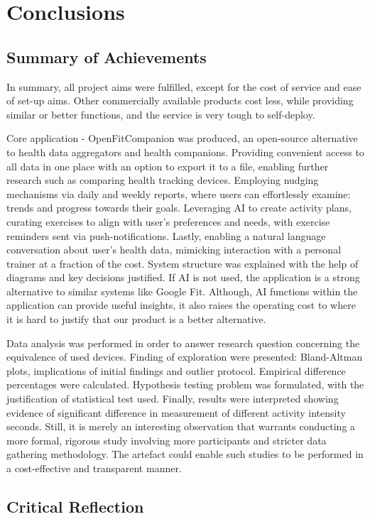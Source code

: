 \chapter{Conclusions}
\label{cha:evaluation}
\section{Summary of Achievements}
In summary, all project aims were fulfilled, except for the cost of service and ease of set-up aims. Other commercially available products cost less, while providing similar or better functions, and the service is very tough to self-deploy.

Core application - OpenFitCompanion was produced, an open-source alternative to health data aggregators and health companions. Providing convenient access to all data in one place with an option to export it to a file, enabling further research such as comparing health tracking devices. Employing nudging mechanisms via daily and weekly reports, where users can effortlessly examine: trends and progress towards their goals. Leveraging AI to create activity plans, curating exercises to align with user's preferences and needs, with exercise reminders sent via push-notifications. Lastly, enabling a natural language conversation about user's health data, mimicking interaction with a personal trainer at a fraction of the cost. System structure was explained with the help of diagrams and key decisions justified. If AI is not used, the application is a strong alternative to similar systems like Google Fit. Although, AI functions within the application can provide useful insights, it also raises the operating cost to where it is hard to justify that our product is a better alternative. 

Data analysis was performed in order to answer research question concerning the equivalence of used devices. Finding of exploration were presented: Bland-Altman plots, implications of initial findings and outlier protocol. Empirical difference percentages were calculated. Hypothesis testing problem was formulated, with the justification of statistical test used. Finally, results were interpreted showing evidence of significant difference in measurement of different activity intensity seconds. Still, it is merely an interesting observation that warrants conducting a more formal, rigorous study involving more participants and stricter data gathering methodology. The artefact could enable such studies to be performed in a cost-effective and transparent manner.
\section{Critical Reflection}
